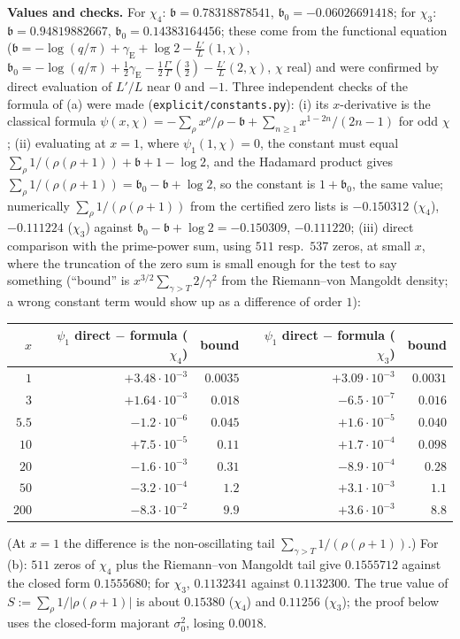 \documentclass[11pt]{amsart}
\theoremstyle{definition}
\numberwithin{equation}{section}
\begin{document}
\medskip\noindent\textbf{Values and checks.} For $\chi_4$:
$\mathfrak b=0.78318878541$, $\mathfrak b_0=-0.06026691418$; for
$\chi_3$: $\mathfrak b=0.94819882667$, $\mathfrak b_0=0.14383164456$;
these come from the functional equation
($\mathfrak b=-\log(q/\pi)+\gamma_{\mathrm E}+\log2
-\frac{L'}{L}(1,\chi)$,
$\mathfrak b_0=-\log(q/\pi)+\tfrac12\gamma_{\mathrm E}
-\tfrac12\frac{\Gamma'}{\Gamma}(\tfrac32)-\frac{L'}{L}(2,\chi)$,
$\chi$ real) and were confirmed by direct evaluation of $L'/L$ near
$0$ and $-1$. Three independent checks of the formula of (a) were
made (\texttt{explicit/constants.py}): (i) its $x$-derivative is the
classical formula $\psi(x,\chi)=-\sum_\rho x^\rho/\rho
-\mathfrak b+\sum_{n\ge1}x^{1-2n}/(2n-1)$ for odd $\chi$
\cite[Ch.~19]{Dav00}; (ii) evaluating at $x=1$, where
$\psi_1(1,\chi)=0$, the constant must equal
$\sum_\rho1/(\rho(\rho+1))+\mathfrak b+1-\log2$, and the Hadamard
product gives $\sum_\rho1/(\rho(\rho+1))=\mathfrak b_0-\mathfrak b
+\log2$, so the constant is $1+\mathfrak b_0$, the same value;
numerically $\sum_\rho1/(\rho(\rho+1))$ from the certified zero lists
is $-0.150312$ ($\chi_4$), $-0.111224$ ($\chi_3$) against
$\mathfrak b_0-\mathfrak b+\log2=-0.150309$, $-0.111220$; (iii)
direct comparison with the prime-power sum, using $511$ resp.\ $537$
zeros, at small $x$, where the truncation of the zero sum is small
enough for the test to say something (``bound'' is
$x^{3/2}\sum_{\gamma>T}2/\gamma^2$ from the Riemann--von Mangoldt
density; a wrong constant term would show up as a difference of
order $1$):
\begin{center}
\small
\begin{tabular}{rrrrr}
\toprule
$x$ & $\psi_1$ direct $-$ formula ($\chi_4$) & bound &
$\psi_1$ direct $-$ formula ($\chi_3$) & bound\\
\midrule
$1$ & $+3.48\cdot10^{-3}$ & $0.0035$ & $+3.09\cdot10^{-3}$ & $0.0031$\\
$3$ & $+1.64\cdot10^{-3}$ & $0.018$ & $-6.5\cdot10^{-7}$ & $0.016$\\
$5.5$ & $-1.2\cdot10^{-6}$ & $0.045$ & $+1.6\cdot10^{-5}$ & $0.040$\\
$10$ & $+7.5\cdot10^{-5}$ & $0.11$ & $+1.7\cdot10^{-4}$ & $0.098$\\
$20$ & $-1.6\cdot10^{-3}$ & $0.31$ & $-8.9\cdot10^{-4}$ & $0.28$\\
$50$ & $-3.2\cdot10^{-4}$ & $1.2$ & $+3.1\cdot10^{-3}$ & $1.1$\\
$200$ & $-8.3\cdot10^{-2}$ & $9.9$ & $+3.6\cdot10^{-3}$ & $8.8$\\
\bottomrule
\end{tabular}
\end{center}
(At $x=1$ the difference is the non-oscillating tail
$\sum_{\gamma>T}1/(\rho(\rho+1))$.) For (b): $511$ zeros of $\chi_4$
plus the Riemann--von Mangoldt tail give $0.1555712$ against the
closed form $0.1555680$; for $\chi_3$, $0.1132341$ against
$0.1132300$. The true value of $S:=\sum_\rho1/|\rho(\rho+1)|$ is
about $0.15380$ ($\chi_4$) and $0.11256$ ($\chi_3$); the proof below
uses the closed-form majorant $\sigma_0^2$, losing $0.0018$.
\end{document}
